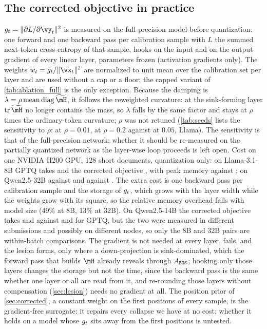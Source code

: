 \subsection{The corrected objective in practice}
\label{app:corrected}
$\gsens=\|\partial L/\partial\vy_t\|^2$ is measured on the full-precision model before quantization: one forward and one backward pass per calibration sample with $L$ the summed next-token cross-entropy of that sample, hooks on the input and on the output gradient of every linear layer, parameters frozen (activation gradients only).
The weights $\wtok=\gsens/\|\vx_t\|^2$ are normalized to unit mean over the calibration set per layer and are used without a cap or a floor; the capped variant of \cref{tab:ablation_full} is the only exception.
Because the damping is $\lambda=\rho\operatorname{mean}\operatorname{diag}\hessw$, it follows the reweighted curvature: at the sink-forming layer $\operatorname{tr}\hessw$ no longer contains the \bos{} mass, so $\lambda$ falls by the same factor and stays at $\rho$ times the ordinary-token curvature; $\rho$ was not retuned (\cref{tab:seeds} lists the sensitivity to $\rho$: \CorrRhoLow{} at $\rho=0.01$, \CorrRhoHigh{} at $\rho=0.2$ against \LcorrIF{} at $0.05$, Llama).
The sensitivity is that of the full-precision network; whether it should be re-measured on the partially quantized network as the layer-wise loop proceeds is left open.
Cost on one NVIDIA H200 GPU, 128 short documents, quantization only: on Llama-3.1-8B GPTQ takes \CostGptq{} and the corrected objective \CostCorr{}, with peak memory \MemGptq{} against \MemCorr{}; on Qwen2.5-32B \CostQthirtytwoGptq{} against \CostQthirtytwo{} and \MemQthirtytwoGptq{} against \MemQthirtytwo{}.
The extra cost is one backward pass per calibration sample and the storage of $g_t$, which grows with the layer width while the weights grow with its square, so the relative memory overhead falls with model size (49\% at 8B, 13\% at 32B).
On Qwen2.5-14B the corrected objective takes \CostQfourteen{} and \MemQfourteen{} against \CostQfourteenGptq{} and \MemQfourteenGptq{} for GPTQ, but the two were measured in different submissions and possibly on different nodes, so only the 8B and 32B pairs are within-batch comparisons.
The gradient is not needed at every layer.
 fails, and the lesion forms, only where a down-projection is sink-dominated, which the forward pass that builds $\hess$ already reveals through $A_{\texttt{BOS}}$; hooking only those layers changes the storage but not the time, since the backward pass is the same whether one layer or all are read from it, and re-rounding those layers without compensation (\cref{sec:lesion}) needs no gradient at all.
The position prior of \cref{sec:corrected}, a constant weight on the first positions of every sample, is the gradient-free surrogate: it repairs every collapse we have at no cost; whether it holds on a model whose $g_t$ sits away from the first positions is untested.

